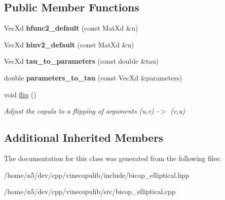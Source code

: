 \subsection*{Public Member Functions}
\begin{DoxyCompactItemize}
\item 
Vec\+Xd {\bfseries hfunc2\+\_\+default} (const Mat\+Xd \&u)\hypertarget{class_elliptical_bicop_a18f5fa85bd6ed14d56e0b269c091ac3b}{}\label{class_elliptical_bicop_a18f5fa85bd6ed14d56e0b269c091ac3b}

\item 
Vec\+Xd {\bfseries hinv2\+\_\+default} (const Mat\+Xd \&u)\hypertarget{class_elliptical_bicop_ac94477889cbd73c30eb7010001e9fec8}{}\label{class_elliptical_bicop_ac94477889cbd73c30eb7010001e9fec8}

\item 
Vec\+Xd {\bfseries tau\+\_\+to\+\_\+parameters} (const double \&tau)\hypertarget{class_elliptical_bicop_a4a478ff32dddf4561c8d97041b943e1f}{}\label{class_elliptical_bicop_a4a478ff32dddf4561c8d97041b943e1f}

\item 
double {\bfseries parameters\+\_\+to\+\_\+tau} (const Vec\+Xd \&parameters)\hypertarget{class_elliptical_bicop_a45f034c75af02d9b20b4af5c16754e5a}{}\label{class_elliptical_bicop_a45f034c75af02d9b20b4af5c16754e5a}

\item 
void \hyperlink{class_elliptical_bicop_a176f55b005e74efe21abd01651ea8967}{flip} ()\hypertarget{class_elliptical_bicop_a176f55b005e74efe21abd01651ea8967}{}\label{class_elliptical_bicop_a176f55b005e74efe21abd01651ea8967}

\begin{DoxyCompactList}\small\item\em Adjust the copula to a flipping of arguments (u,v) -\/$>$ (v,u) \end{DoxyCompactList}\end{DoxyCompactItemize}
\subsection*{Additional Inherited Members}


The documentation for this class was generated from the following files\+:\begin{DoxyCompactItemize}
\item 
/home/n5/dev/cpp/vinecopulib/include/bicop\+\_\+elliptical.\+hpp\item 
/home/n5/dev/cpp/vinecopulib/src/bicop\+\_\+elliptical.\+cpp\end{DoxyCompactItemize}
